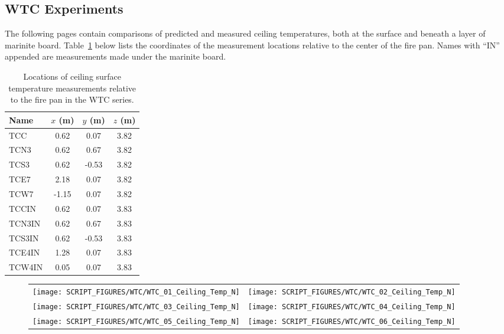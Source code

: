 \clearpage


\subsection{WTC Experiments}

The following pages contain comparisons of predicted and measured ceiling temperatures, both at the surface and beneath a layer of marinite board. Table~\ref{WTC_Ceiling} below lists the coordinates of the measurement locations relative to the center of the fire pan. Names with ``IN'' appended are measurements made under the marinite board.


\begin{table}[h!]
\caption[Ceiling surface measurement locations for the WTC series]{Locations of ceiling surface temperature measurements relative to the fire pan in the WTC series.}
\begin{center}
\begin{tabular}{|l|c|c|c|}
\hline
Name                & $x$ (m)   & $y$ (m)   & $z$ (m)   \\ \hline \hline
TCC                 & 0.62      & 0.07      & 3.82      \\ \hline
TCN3                & 0.62      & 0.67      & 3.82      \\ \hline
TCS3                & 0.62      & -0.53     & 3.82      \\ \hline
TCE7                & 2.18      & 0.07      & 3.82      \\ \hline
TCW7                & -1.15     & 0.07      & 3.82      \\ \hline \hline
TCCIN               & 0.62      & 0.07      & 3.83      \\ \hline
TCN3IN              & 0.62      & 0.67      & 3.83      \\ \hline
TCS3IN              & 0.62      & -0.53     & 3.83      \\ \hline
TCE4IN              & 1.28      & 0.07      & 3.83      \\ \hline
TCW4IN              & 0.05      & 0.07      & 3.83      \\ \hline
\end{tabular}
\end{center}
\label{WTC_Ceiling}
\end{table}

\newpage

\begin{figure}[p]
\begin{tabular*}{\textwidth}{l@{\extracolsep{\fill}}r}
\texttt{[image: SCRIPT\_FIGURES/WTC/WTC\_01\_Ceiling\_Temp\_N]} &
\texttt{[image: SCRIPT\_FIGURES/WTC/WTC\_02\_Ceiling\_Temp\_N]} \\
\texttt{[image: SCRIPT\_FIGURES/WTC/WTC\_03\_Ceiling\_Temp\_N]} &
\texttt{[image: SCRIPT\_FIGURES/WTC/WTC\_04\_Ceiling\_Temp\_N]} \\
\texttt{[image: SCRIPT\_FIGURES/WTC/WTC\_05\_Ceiling\_Temp\_N]} &
\texttt{[image: SCRIPT\_FIGURES/WTC/WTC\_06\_Ceiling\_Temp\_N]}
\end{tabular*}
\label{NIST_WTC_Ceiling_N}
\end{figure}


